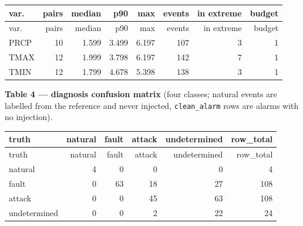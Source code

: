 \documentclass[10pt,a4paper]{article}
\begin{document}
{\small
\setlength{\tabcolsep}{3pt}
\setlength{\LTleft}{\fill}
\setlength{\LTright}{\fill}
\begin{longtable}{lrrrrrrr}
\toprule
var. & pairs & median & p90 & max & events & in extreme & budget \\
\midrule
\endfirsthead
\toprule
var. & pairs & median & p90 & max & events & in extreme & budget \\
\midrule
\endhead
\bottomrule
\endlastfoot
PRCP & 10 & 1.599 & 3.499 & 6.197 & 107 & 3 & 1 \\
TMAX & 12 & 1.999 & 3.798 & 6.197 & 142 & 7 & 1 \\
TMIN & 12 & 1.799 & 4.678 & 5.398 & 138 & 3 & 1 \\
\end{longtable}
}

\textbf{Table 4 — diagnosis confusion matrix} (four classes; natural events are labelled from the reference and never injected, \texttt{clean\_\allowbreak{}alarm} rows are alarms with no injection).

{\small
\setlength{\tabcolsep}{4.5pt}
\setlength{\LTleft}{\fill}
\setlength{\LTright}{\fill}
\begin{longtable}{lrrrrr}
\toprule
truth & natural & fault & attack & undetermined & row\_\allowbreak{}total \\
\midrule
\endfirsthead
\toprule
truth & natural & fault & attack & undetermined & row\_\allowbreak{}total \\
\midrule
\endhead
\bottomrule
\endlastfoot
natural & 4 & 0 & 0 & 0 & 4 \\
fault & 0 & 63 & 18 & 27 & 108 \\
attack & 0 & 0 & 45 & 63 & 108 \\
undetermined & 0 & 0 & 2 & 22 & 24 \\
\end{longtable}
}
\end{document}
